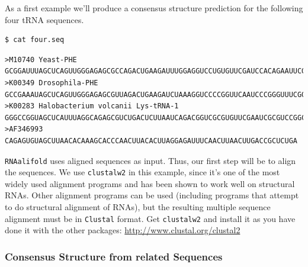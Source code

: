 \documentclass[a4paper]{article}
\newcommand{\frametitle}[1]{\subsubsection{#1}}
\begin{document}
As a first example we'll produce a consensus structure prediction for
the following four tRNA sequences.
\begin{verbatim}
$ cat four.seq
\end{verbatim}
\vspace*{-3ex}
\begin{scriptsize}
\begin{verbatim}
>M10740 Yeast-PHE
GCGGAUUUAGCUCAGUUGGGAGAGCGCCAGACUGAAGAUUUGGAGGUCCUGUGUUCGAUCCACAGAAUUCGCA
>K00349 Drosophila-PHE
GCCGAAAUAGCUCAGUUGGGAGAGCGUUAGACUGAAGAUCUAAAGGUCCCCGGUUCAAUCCCGGGUUUCGGCA
>K00283 Halobacterium volcanii Lys-tRNA-1
GGGCCGGUAGCUCAUUUAGGCAGAGCGUCUGACUCUUAAUCAGACGGUCGCGUGUUCGAAUCGCGUCCGGCCCA
>AF346993
CAGAGUGUAGCUUAACACAAAGCACCCAACUUACACUUAGGAGAUUUCAACUUAACUUGACCGCUCUGA
\end{verbatim}%
\end{scriptsize}

\vspace*{3ex}\noindent
\texttt{RNAalifold} uses aligned sequences as input. Thus, our first
step will be to align the sequences. We use \texttt{clustalw2} in this
example, since it's one of the most widely used alignment programs and
has been shown to work well on structural RNAs. Other alignment
programs can be used (including programs that attempt to do structural
alignment of RNAs), but the resulting multiple sequence alignment must
be in \texttt{Clustal} format. Get \texttt{clustalw2} and install it as you have done it with the other packages: \url{http://www.clustal.org/clustal2}

 \frametitle{Consensus Structure from related Sequences}
\end{document}
